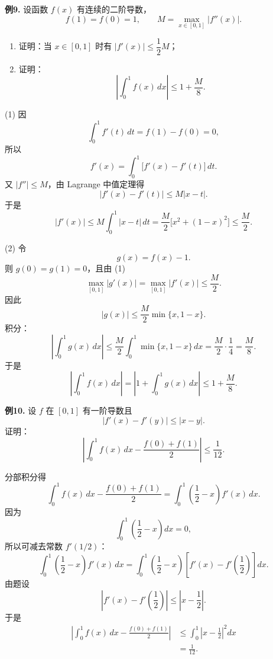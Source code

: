 \begin{problemblock}
\textbf{例9.} 设函数 \(f(x)\) 有连续的二阶导数，
\[
f(1)=f(0)=1,\qquad
M=\max_{x\in[0,1]}|f''(x)|.
\]
\begin{enumerate}[label=(\arabic*), leftmargin=2.2em]
\item 证明：当 \(x\in[0,1]\) 时有 \(|f'(x)|\le\dfrac12M\)；
\item 证明：
\[
\left|\int_0^1f(x)\,dx\right|\le1+\frac{M}{8}.
\]
\end{enumerate}
\end{problemblock}
\begin{solutionblock}
(1) 因
\[
\int_0^1f'(t)\,dt=f(1)-f(0)=0,
\]
所以
\[
f'(x)=\int_0^1\bigl[f'(x)-f'(t)\bigr]\,dt.
\]
又 \(|f''|\le M\)，由 Lagrange 中值定理得
\[
|f'(x)-f'(t)|\le M|x-t|.
\]
于是
\[
|f'(x)|
\le M\int_0^1|x-t|\,dt
=\frac{M}{2}\bigl[x^2+(1-x)^2\bigr]
\le\frac M2.
\]

(2) 令
\[
g(x)=f(x)-1.
\]
则 \(g(0)=g(1)=0\)，且由 (1)
\[
\max_{[0,1]}|g'(x)|=\max_{[0,1]}|f'(x)|\le\frac M2.
\]
因此
\[
|g(x)|\le\frac M2\min\{x,1-x\}.
\]
积分：
\[
\left|\int_0^1g(x)\,dx\right|
\le\frac M2\int_0^1\min\{x,1-x\}\,dx
=\frac M2\cdot\frac14=\frac M8.
\]
于是
\[
\left|\int_0^1f(x)\,dx\right|
=\left|1+\int_0^1g(x)\,dx\right|
\le1+\frac M8.
\]
\end{solutionblock}

\begin{problemblock}
\textbf{例10.} 设 \(f\) 在 \([0,1]\) 有一阶导数且
\[
|f'(x)-f'(y)|\le |x-y|.
\]
证明：
\[
\left|\int_0^1f(x)\,dx-\frac{f(0)+f(1)}2\right|
\le \frac1{12}.
\]
\end{problemblock}
\begin{solutionblock}
分部积分得
\[
\int_0^1 f(x)\,dx-\frac{f(0)+f(1)}2
=\int_0^1\left(\frac12-x\right)f'(x)\,dx.
\]
因为
\[
\int_0^1\left(\frac12-x\right)dx=0,
\]
所以可减去常数 \(f'(1/2)\)：
\[
\int_0^1\left(\frac12-x\right)f'(x)\,dx
=\int_0^1\left(\frac12-x\right)\left[f'(x)-f'\left(\frac12\right)\right]dx.
\]
由题设
\[
\left|f'(x)-f'\left(\frac12\right)\right|
\le\left|x-\frac12\right|.
\]
于是
\[
\begin{aligned}
\left|\int_0^1f(x)\,dx-\frac{f(0)+f(1)}2\right|
&\le
\int_0^1\left|x-\frac12\right|^2dx\\
&=\frac1{12}.
\end{aligned}
\]
\end{solutionblock}

